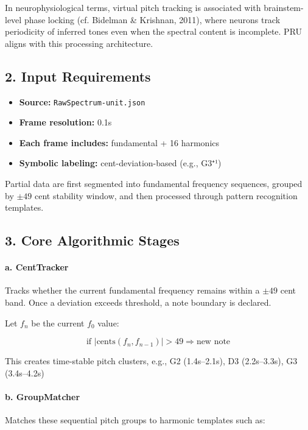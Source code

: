 \documentclass{article}
\begin{document}
In neurophysiological terms, virtual pitch tracking is associated with brainstem-level phase locking (cf. Bidelman \& Krishnan, 2011), where neurons track periodicity of inferred tones even when the spectral content is incomplete. PRU aligns with this processing architecture.

\subsection*{2. Input Requirements}

\begin{itemize}
    \item \textbf{Source:} \texttt{RawSpectrum-unit.json}
    \item \textbf{Frame resolution:} 0.1s
    \item \textbf{Each frame includes:} fundamental + 16 harmonics
    \item \textbf{Symbolic labeling:} cent-deviation-based (e.g., G3⁺¹)
\end{itemize}

Partial data are first segmented into fundamental frequency sequences, grouped by $\pm49$ cent stability window, and then processed through pattern recognition templates.

\subsection*{3. Core Algorithmic Stages}

\paragraph{a. CentTracker}

Tracks whether the current fundamental frequency remains within a $\pm49$ cent band. Once a deviation exceeds threshold, a note boundary is declared.

Let $f_n$ be the current $f_0$ value:

\[
\text{if } \left| \text{cents}(f_n, f_{n-1}) \right| > 49 \Rightarrow \text{new note}
\]

This creates time-stable pitch clusters, e.g., G2 (1.4s–2.1s), D3 (2.2s–3.3s), G3 (3.4s–4.2s)

\paragraph{b. GroupMatcher}

Matches these sequential pitch groups to harmonic templates such as:
\end{document}
